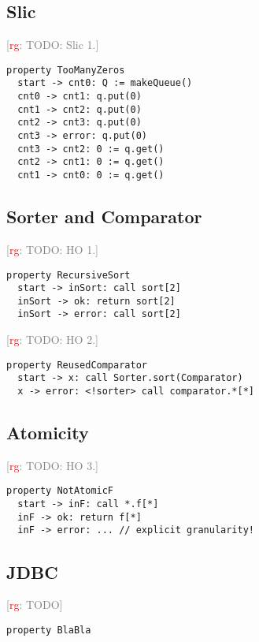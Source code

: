 \documentclass[preprint]{sigplanconf} %
\newcommand{\note}[2]{\textcolor{gray}{[\textcolor{red}{#1}: #2]}}
\newcommand{\rg}[1]{\note{rg}{#1}}
\theoremstyle{definition}
\theoremstyle{remark}
\begin{document}
\subsection{Slic} %

\rg{TODO: Slic 1.}
\par\medskip\noindent
\begin{Verbatim}
property TooManyZeros
  start -> cnt0: Q := makeQueue()
  cnt0 -> cnt1: q.put(0)
  cnt1 -> cnt2: q.put(0)
  cnt2 -> cnt3: q.put(0)
  cnt3 -> error: q.put(0)
  cnt3 -> cnt2: 0 := q.get()
  cnt2 -> cnt1: 0 := q.get()
  cnt1 -> cnt0: 0 := q.get()
\end{Verbatim}

\subsection{Sorter and Comparator} %

\rg{TODO: HO 1.}
\par\medskip\noindent
\begin{Verbatim}
property RecursiveSort
  start -> inSort: call sort[2]
  inSort -> ok: return sort[2]
  inSort -> error: call sort[2]
\end{Verbatim}

\rg{TODO: HO 2.}
\par\medskip\noindent
\begin{Verbatim}
property ReusedComparator
  start -> x: call Sorter.sort(Comparator)
  x -> error: <!sorter> call comparator.*[*]
\end{Verbatim}

\subsection{Atomicity} %

\rg{TODO: HO 3.}
\par\medskip\noindent
\begin{Verbatim}
property NotAtomicF
  start -> inF: call *.f[*]
  inF -> ok: return f[*]
  inF -> error: ... // explicit granularity!
\end{Verbatim}

\subsection{JDBC} \label{sec:examples.jdbc} %

\rg{TODO}
\par\medskip\noindent
\begin{Verbatim}
property BlaBla
\end{Verbatim}
\end{document}
